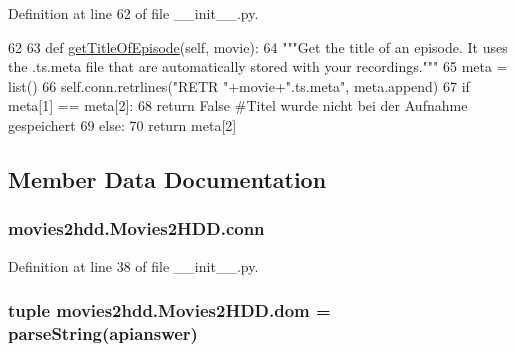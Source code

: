Definition at line 62 of file \-\_\-\-\_\-init\-\_\-\-\_\-.\-py.


\begin{DoxyCode}
62 
63     \textcolor{keyword}{def }\hyperlink{classmovies2hdd_1_1_movies2_h_d_d_af70b18fab503d288570e9c97e3e0cc46}{getTitleOfEpisode}(self, movie):
64         \textcolor{stringliteral}{"""Get the title of an episode. It uses the .ts.meta file that are automatically stored with your
       recordings."""}
65         meta = list()
66         self.conn.retrlines(\textcolor{stringliteral}{"RETR "}+movie+\textcolor{stringliteral}{".ts.meta"}, meta.append)
67         \textcolor{keywordflow}{if} meta[1] == meta[2]:
68             \textcolor{keywordflow}{return} \textcolor{keyword}{False} \textcolor{comment}{#Titel wurde nicht bei der Aufnahme gespeichert}
69         \textcolor{keywordflow}{else}:
70             \textcolor{keywordflow}{return} meta[2]
    
\end{DoxyCode}


\subsection{Member Data Documentation}
\hypertarget{classmovies2hdd_1_1_movies2_h_d_d_a0b93dbfa80fc06d13d8cdad9ea7bae0b}{
\subsubsection[{conn}]{\setlength{\rightskip}{0pt plus 5cm}movies2hdd.\-Movies2\-H\-D\-D.\-conn}}\label{classmovies2hdd_1_1_movies2_h_d_d_a0b93dbfa80fc06d13d8cdad9ea7bae0b}


Definition at line 38 of file \-\_\-\-\_\-init\-\_\-\-\_\-.\-py.

\hypertarget{classmovies2hdd_1_1_movies2_h_d_d_a23cc104177423d3145c753fb423fbf7f}{
\subsubsection[{dom}]{\setlength{\rightskip}{0pt plus 5cm}tuple movies2hdd.\-Movies2\-H\-D\-D.\-dom = parse\-String(apianswer)\hspace{0.3cm}{\ttfamily [static]}}}\label{classmovies2hdd_1_1_movies2_h_d_d_a23cc104177423d3145c753fb423fbf7f}


